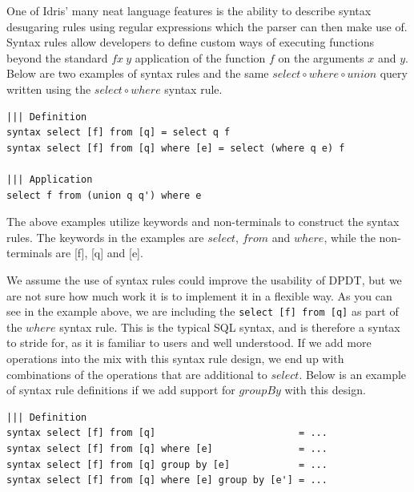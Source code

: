 \documentclass[12pt]{article}
\begin{document}
One of Idris' many neat language features is the ability to describe syntax desugaring rules using regular expressions which the parser can then make use of.
Syntax rules allow developers to define custom ways of executing functions beyond the standard $f x \: y$ application of the function $f$ on the arguments $x$ and $y$.
Below are two examples of syntax rules and the same $select \circ where \circ union$ query written using the $select \circ where$ syntax rule.

\begin{lstlisting}
||| Definition
syntax select [f] from [q] = select q f
syntax select [f] from [q] where [e] = select (where q e) f

||| Application
select f from (union q q') where e
\end{lstlisting}

The above examples utilize keywords and non-terminals to construct the syntax rules.
The keywords in the examples are $select$, $from$ and $where$, while the non-terminals are [f], [q] and [e].

We assume the use of syntax rules could improve the usability of DPDT, but we are not sure how much work it is to implement it in a flexible way. 
As you can see in the example above, we are including the \texttt{select [f] from [q]} as part of the $where$ syntax rule.
This is the typical SQL syntax, and is therefore a syntax to stride for, as it is familiar to users and well understood.
If we add more operations into the mix with this syntax rule design, we end up with combinations of the operations that are additional to $select$.
Below is an example of syntax rule definitions if we add support for $groupBy$ with this design.

\begin{lstlisting}
||| Definition
syntax select [f] from [q]                         = ...
syntax select [f] from [q] where [e]               = ...
syntax select [f] from [q] group by [e]            = ...
syntax select [f] from [q] where [e] group by [e'] = ...
\end{lstlisting}




\end{document}
